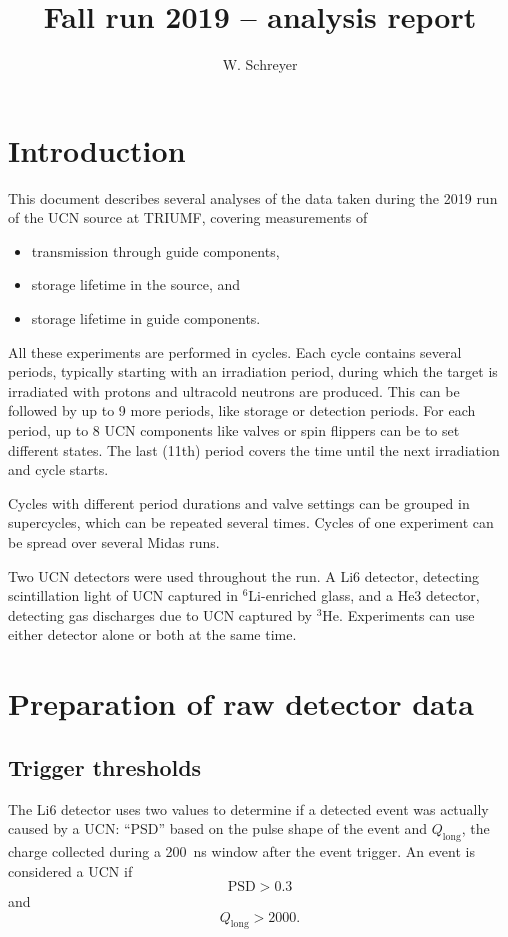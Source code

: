 \documentclass[10pt,letterpaper]{article}
\author{W. Schreyer}
\title{Fall run 2019 -- analysis report}
\begin{document}
\maketitle

\tableofcontents

\section{Introduction}

This document describes several analyses of the data taken during the 2019 run of the UCN source at TRIUMF, covering measurements of
\begin{itemize}
\item transmission through guide components,
\item storage lifetime in the source, and
\item storage lifetime in guide components.
\end{itemize}

All these experiments are performed in cycles. Each cycle contains several periods, typically starting with an irradiation period, during which the target is irradiated with protons and ultracold neutrons are produced. This can be followed by up to 9 more periods, like storage or detection periods. For each period, up to 8 UCN components like valves or spin flippers can be to set different states. The last (11th) period covers the time until the next irradiation and cycle starts.

Cycles with different period durations and valve settings can be grouped in supercycles, which can be repeated several times. Cycles of one experiment can be spread over several Midas runs.

Two UCN detectors were used throughout the run. A Li6 detector, detecting scintillation light of UCN captured in $^6$Li-enriched glass, and a He3 detector, detecting gas discharges due to UCN captured by $^3$He. Experiments can use either detector alone or both at the same time.


\section{Preparation of raw detector data}

\subsection{Trigger thresholds}

The Li6 detector uses two values to determine if a detected event was actually caused by a UCN: ``PSD'' based on the pulse shape of the event and $Q_\mathrm{long}$, the charge collected during a \SI{200}{\nano\second} window after the event trigger. An event is considered a UCN if
\begin{equation}
\mathrm{PSD} > 0.3
\end{equation}
and
\begin{equation}
Q_\mathrm{long} > 2000.
\end{equation}
\end{document}
